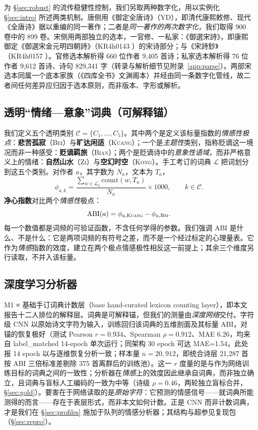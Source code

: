 \documentclass[11pt]{article}
\begin{document}
为 \S\ref{sec:robust} 的流传稳健性控制，我们另取两种数字化，用以实例化 \S\ref{sec:intro} 所述两类机制。唐侧用《御定全唐诗》（YD），即清代康熙敕修、现代《全唐诗》据以重编的同一著作；二者是\emph{同一著作的两次数字化}，我们取得 900 卷中的 899 卷。宋侧用两部独立的选本，一官修、一私家：《御選宋詩》，即康熙御定《御選宋金元明四朝詩》（KR4h0143 \citealp{kangxi1709}）的宋诗部分；与《宋詩鈔》（KR4h0157 \citealp{wu1671}）。官修选本解析得 660 位作者 9{,}405 首诗；私家选本解析得 76 位作者 9{,}612 首诗、诗句 829{,}341 字（转录与解析细节见附录~\ref{app:parse}）。两部宋选本同属一个底本家族（《四库全书》文渊阁本）并经由同一条数字化管线，故二者间任何差异应归因于选本原则，而非版本、字形或解析。

\subsection{透明“情绪—意象”词典（可解释锚）}
\label{sec:lexicon}
我们定义五个透明类别 $\mathcal{C}{=}\{C_1,\dots,C_5\}$。其中两个是定义该标量指数的\emph{情感性极点}：\textbf{悲苦孤寂}（\textsc{Bei}）与\textbf{旷达闲适}（\textsc{Kuang}）；一个是\emph{主题性}类别，指称贬谪这一境况而非一种感受：\textbf{贬谪羁旅}（\textsc{Bian}）；两个是贬谪诗中的\emph{意象性语域}，而非严格意义上的情绪：\textbf{自然山水}（\textsc{Zi}）与\textbf{空幻时空}（\textsc{Kong}）。手工考订的词典 $\mathcal{L}$ 把词划分到这五个类别。对作者 $a$，其字数为 $N_a$，文本为 $T_a$，
\begin{equation}
\phi_{a,k} = \frac{\sum_{w\in\mathcal{L}_k}\mathrm{count}(w,T_a)}
                   {N_a}\times 1000,
\qquad k\in\mathcal{C}.
\end{equation}
\textbf{净心指数}对比两个\emph{情感性}极点：
\begin{equation}
\mathrm{ABI}(a)=\phi_{a,\textsc{Kuang}}-\phi_{a,\textsc{Bei}}.
\end{equation}
每一个数值都是词频的可验证函数，不含任何学得的参数。我们强调 ABI 是什么、不是什么：它是两项词频的有符号之差，而不是一个经过标定的心理量表。它作为\emph{情感}指数的效度，建立在两个极点情感极性相反这一前提上；其余三个维度另行读取，不并入该标量。

\subsection{深度学习分析器}
\label{sec:dl}
M1 ≡ 基础手订词典计数层（base hand-curated lexicon counting layer），即本文报告十二人排位的解释层。词典是可解释锚，但我们的测量由\emph{深度网络}交付。字符级 CNN 以原始诗文字符为输入，训练回归该词典的五维剖面及其标量 ABI，对锚的恢复极好（测试 Pearson $r{=}0.934$、Spearman $\rho{=}0.912$、MAE $6.26$，均来自 label\_matched 14-epoch 单次运行；同架构 30 epoch 可达 MAE=1.54，此处报 14 epoch 以与逐维恢复分析一致；样本量 $n{=}20{,}912$，即统合诗层 21{,}287 首按 ABI 三倍标准差剔除 375 首离群后的训练池）。这一 $r$ 度量的是与作为网络训练目标的词典之间的一致性；分析器在\emph{情感}上的效度因此继承自词典，而非独立确立，且词典与盲标人工编码的一致为中等（诗级 $\rho{=}0.46$，两轮独立盲标合并，\S\ref{sec:gold}）。要害在于网络读取的是\emph{原始字符}：它预测的情感信号——就词典所能测得的而言——存在于表层形式，而非本文如何计数。正是 CNN 而非计数词典，才是我们在 \S\ref{sec:profiles} 施加于队列的情感分析器；其结构与超参见复现包（\S\ref{sec:repro}）。
\end{document}
